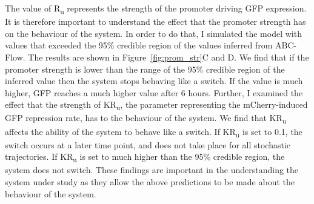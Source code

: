 The value of R\textsubscript{u} represents the strength of the promoter driving GFP expression. It is therefore important to understand the effect that the promoter strength has on the behaviour of the system. In order to do that, I simulated the model with values that exceeded the 95\% credible region of the values inferred from ABC-Flow. The results are shown in Figure~\ref{fig:prom_str}C and D. We find that if the promoter strength is lower than the range of the 95\% credible region of the inferred value then the system stops behaving like a switch. If the value is much higher, GFP reaches a much higher value after 6 hours. Further, I examined the effect that the strength of KR\textsubscript{u}, the parameter representing the mCherry-induced GFP repression rate, has to the behaviour of the system. We find that KR\textsubscript{u} affects the ability of the system to behave like a switch. If KR\textsubscript{u} is set to 0.1, the switch occurs at a later time point, and does not take place for all stochastic trajectories. If KR\textsubscript{u} is set to much higher than the 95\% credible region, the system does not switch. These findings are important in the understanding the system under study as they allow the above predictions to be made about the behaviour of the system.  


